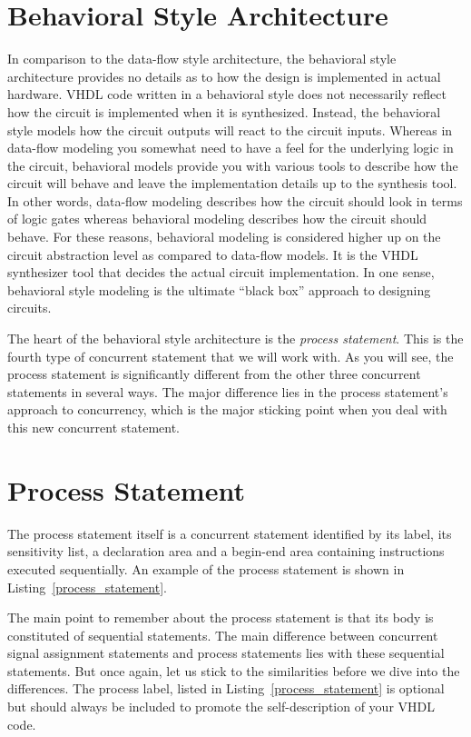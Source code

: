 \section{Behavioral Style Architecture}
In comparison to the data-flow style architecture, the behavioral style architecture provides no details as to how the design is implemented in actual hardware. VHDL code written in a behavioral style does not necessarily reflect how the circuit is implemented when it is synthesized. Instead, the behavioral style models how the circuit outputs will react to the circuit inputs. Whereas in data-flow modeling you somewhat need to have a feel for the underlying logic in the circuit, behavioral models provide you with various tools to describe how the circuit will behave and leave the implementation details up to the synthesis tool. In other words, data-flow modeling describes how the circuit should look in terms of logic gates whereas behavioral modeling describes how the circuit should behave. For these reasons, behavioral modeling is considered higher up on the circuit abstraction level as compared to data-flow models. It is the VHDL synthesizer tool that decides the actual circuit implementation. In one sense, behavioral style modeling is the ultimate ``black box'' approach to designing circuits.

The heart of the behavioral style architecture is the \textit{process statement}. This is the fourth type of concurrent statement that we will work with. As you will see, the process statement is significantly different from the other three concurrent statements in several ways. The major difference lies in the process statement's approach to concurrency, which is the major sticking point when you deal with this new concurrent statement.

\section{Process Statement}
The process statement itself is a concurrent statement identified by its label, its sensitivity list, a declaration area and a begin-end area containing instructions executed sequentially. An example of the process statement is shown in Listing~\ref{process_statement}.

The main point to remember about the process statement is that its body is constituted of sequential statements. The main difference between concurrent signal assignment statements and process statements lies with these sequential statements. But once again, let us stick to the similarities before we dive into the differences. The process label, listed in Listing~\ref{process_statement} is optional but should always be included to promote the self-description of your VHDL code.

